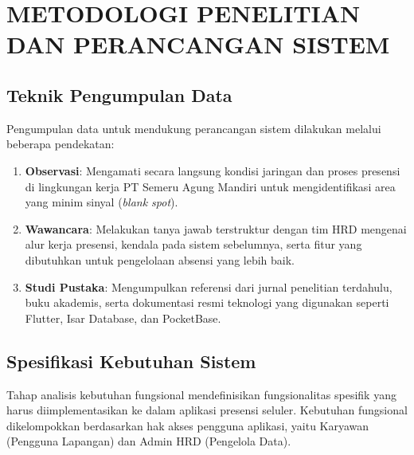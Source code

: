 \chapter{METODOLOGI PENELITIAN DAN PERANCANGAN SISTEM}

\section{Teknik Pengumpulan Data}
Pengumpulan data untuk mendukung perancangan sistem dilakukan melalui beberapa pendekatan:
\begin{enumerate}
    \item \textbf{Observasi}: Mengamati secara langsung kondisi jaringan dan proses presensi di lingkungan kerja PT Semeru Agung Mandiri untuk mengidentifikasi area yang minim sinyal (\textit{blank spot}).
    \item \textbf{Wawancara}: Melakukan tanya jawab terstruktur dengan tim HRD mengenai alur kerja presensi, kendala pada sistem sebelumnya, serta fitur yang dibutuhkan untuk pengelolaan absensi yang lebih baik.
    \item \textbf{Studi Pustaka}: Mengumpulkan referensi dari jurnal penelitian terdahulu, buku akademis, serta dokumentasi resmi teknologi yang digunakan seperti Flutter, Isar Database, dan PocketBase.
\end{enumerate}

\section{Spesifikasi Kebutuhan Sistem}
Tahap analisis kebutuhan fungsional mendefinisikan fungsionalitas spesifik yang harus diimplementasikan ke dalam aplikasi presensi seluler. Kebutuhan fungsional dikelompokkan berdasarkan hak akses pengguna aplikasi, yaitu Karyawan (Pengguna Lapangan) dan Admin HRD (Pengelola Data).

